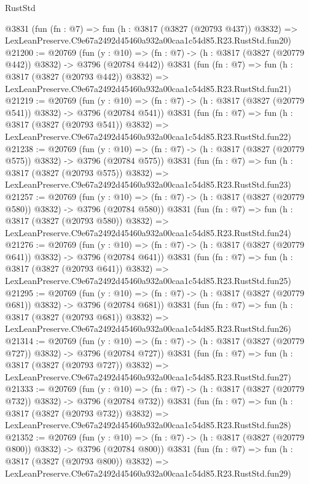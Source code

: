 \begin{lexlean}{RustStd}
\begin{coremodule}
    @3831
    (fun (fn : @7) =>
    fun (h : @3817 (@3827 (@20793 @437)) @3832) =>
    LexLeanPreserve.C9e67a2492d45460a932a00caa1c54d85.R23.RustStd.fun20)
@21200 := @20769
    (fun (y : @10) => (fn : @7) -> (h : @3817 (@3827 (@20779 @442)) @3832) -> @3796 (@20784 @442))
    @3831
    (fun (fn : @7) =>
    fun (h : @3817 (@3827 (@20793 @442)) @3832) =>
    LexLeanPreserve.C9e67a2492d45460a932a00caa1c54d85.R23.RustStd.fun21)
@21219 := @20769
    (fun (y : @10) => (fn : @7) -> (h : @3817 (@3827 (@20779 @541)) @3832) -> @3796 (@20784 @541))
    @3831
    (fun (fn : @7) =>
    fun (h : @3817 (@3827 (@20793 @541)) @3832) =>
    LexLeanPreserve.C9e67a2492d45460a932a00caa1c54d85.R23.RustStd.fun22)
@21238 := @20769
    (fun (y : @10) => (fn : @7) -> (h : @3817 (@3827 (@20779 @575)) @3832) -> @3796 (@20784 @575))
    @3831
    (fun (fn : @7) =>
    fun (h : @3817 (@3827 (@20793 @575)) @3832) =>
    LexLeanPreserve.C9e67a2492d45460a932a00caa1c54d85.R23.RustStd.fun23)
@21257 := @20769
    (fun (y : @10) => (fn : @7) -> (h : @3817 (@3827 (@20779 @580)) @3832) -> @3796 (@20784 @580))
    @3831
    (fun (fn : @7) =>
    fun (h : @3817 (@3827 (@20793 @580)) @3832) =>
    LexLeanPreserve.C9e67a2492d45460a932a00caa1c54d85.R23.RustStd.fun24)
@21276 := @20769
    (fun (y : @10) => (fn : @7) -> (h : @3817 (@3827 (@20779 @641)) @3832) -> @3796 (@20784 @641))
    @3831
    (fun (fn : @7) =>
    fun (h : @3817 (@3827 (@20793 @641)) @3832) =>
    LexLeanPreserve.C9e67a2492d45460a932a00caa1c54d85.R23.RustStd.fun25)
@21295 := @20769
    (fun (y : @10) => (fn : @7) -> (h : @3817 (@3827 (@20779 @681)) @3832) -> @3796 (@20784 @681))
    @3831
    (fun (fn : @7) =>
    fun (h : @3817 (@3827 (@20793 @681)) @3832) =>
    LexLeanPreserve.C9e67a2492d45460a932a00caa1c54d85.R23.RustStd.fun26)
@21314 := @20769
    (fun (y : @10) => (fn : @7) -> (h : @3817 (@3827 (@20779 @727)) @3832) -> @3796 (@20784 @727))
    @3831
    (fun (fn : @7) =>
    fun (h : @3817 (@3827 (@20793 @727)) @3832) =>
    LexLeanPreserve.C9e67a2492d45460a932a00caa1c54d85.R23.RustStd.fun27)
@21333 := @20769
    (fun (y : @10) => (fn : @7) -> (h : @3817 (@3827 (@20779 @732)) @3832) -> @3796 (@20784 @732))
    @3831
    (fun (fn : @7) =>
    fun (h : @3817 (@3827 (@20793 @732)) @3832) =>
    LexLeanPreserve.C9e67a2492d45460a932a00caa1c54d85.R23.RustStd.fun28)
@21352 := @20769
    (fun (y : @10) => (fn : @7) -> (h : @3817 (@3827 (@20779 @800)) @3832) -> @3796 (@20784 @800))
    @3831
    (fun (fn : @7) =>
    fun (h : @3817 (@3827 (@20793 @800)) @3832) =>
    LexLeanPreserve.C9e67a2492d45460a932a00caa1c54d85.R23.RustStd.fun29)

\end{coremodule}
\end{lexlean}
